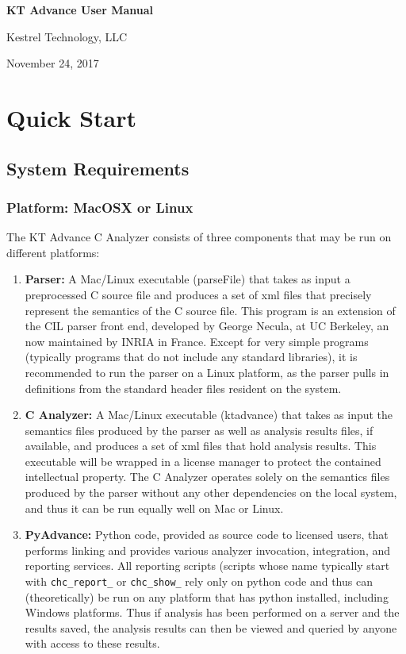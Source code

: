 \documentclass[11pt]{article}
\begin{document}
\vfill
\vfill


{\Large\bf{
KT Advance User Manual}}

\vfill

{\Large{Kestrel Technology, LLC}}

\bigskip

November 24, 2017

\vfill
\vfill
\vfill

\newpage
\tableofcontents
\newpage

\section{Quick Start}

\subsection{System Requirements}

\subsubsection{Platform: MacOSX or Linux}

The KT Advance C Analyzer consists of three components that may be run on
different platforms:
\begin{enumerate}
\item {\bf Parser:} A Mac/Linux executable (parseFile) that takes as input a preprocessed
C source file and produces a set of xml files that precisely represent the
semantics of the C source file. This program is an extension of the CIL
parser front end, developed by George Necula, at UC Berkeley, an now maintained
by INRIA in France. Except for very simple programs (typically programs that do
not include any standard libraries), it is recommended to run the parser on
a Linux platform, as the parser pulls in definitions from the standard header files
resident on the system.
\item {\bf C Analyzer:} A Mac/Linux executable (ktadvance) that takes as input the
semantics files produced by the parser as well as analysis results files, if available, 
and produces a set of xml files that hold analysis results. This executable
will be wrapped in a license manager to protect the contained 
intellectual property. The C Analyzer operates solely on the semantics files produced
by the parser without any other dependencies on the local system, and thus it can be
run equally well on Mac or Linux.
\item {\bf PyAdvance:} Python code, provided as source code to licensed
users, that performs linking and provides various analyzer invocation, 
integration, and reporting services. All reporting scripts (scripts whose name typically
start with {\tt chc\_report\_} or {\tt chc\_show\_} rely only on python code and thus
can (theoretically) be run on any platform that has python installed, including Windows
platforms. Thus if analysis has been performed on a server and the results saved, the 
analysis results can then be viewed and queried by anyone with access to these results.
\end{enumerate}
\end{document}
